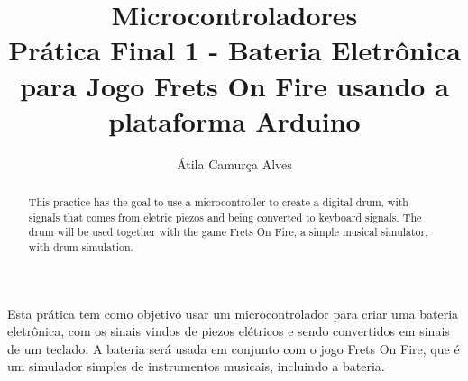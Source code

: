 \documentclass[a4paper,12pt]{article}
\title{Microcontroladores\\Prática Final 1 - Bateria Eletrônica para Jogo Frets On Fire usando a plataforma Arduino}
\author{Átila Camurça Alves}
\begin{document}
\maketitle

\begin{abstract}
  This practice has the goal to use a microcontroller to create a digital drum,
  with signals that comes from eletric piezos and being converted to keyboard signals.
  The drum will be used together with the game Frets On Fire, a simple musical
  simulator, with drum simulation.
\end{abstract}
     
\begin{resumo}
  Esta prática tem como objetivo usar um microcontrolador para criar uma bateria
  eletrônica, com os sinais vindos de piezos elétricos e sendo convertidos em sinais de
  um teclado. A bateria será usada em conjunto com o jogo Frets On Fire, que
  é um simulador simples de instrumentos musicais, incluindo a bateria.
\end{resumo}





\end{document}
